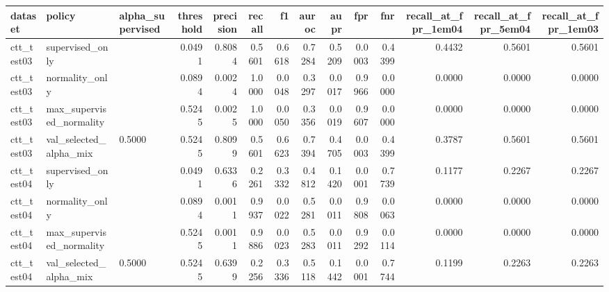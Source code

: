 \begin{tabular}{lllrrrrrrrrrrr}
\toprule
dataset & policy & alpha\_supervised & threshold & precision & recall & f1 & auroc & aupr & fpr & fnr & recall\_at\_fpr\_1em04 & recall\_at\_fpr\_5em04 & recall\_at\_fpr\_1em03 \\
\midrule
ctt\_test03 & supervised\_only &  & 0.0491 & 0.8084 & 0.5601 & 0.6618 & 0.7284 & 0.5209 & 0.0003 & 0.4399 & 0.4432 & 0.5601 & 0.5601 \\
ctt\_test03 & normality\_only &  & 0.0894 & 0.0024 & 1.0000 & 0.0048 & 0.3297 & 0.0017 & 0.9966 & 0.0000 & 0.0000 & 0.0000 & 0.0000 \\
ctt\_test03 & max\_supervised\_normality &  & 0.5245 & 0.0025 & 1.0000 & 0.0050 & 0.3356 & 0.0019 & 0.9607 & 0.0000 & 0.0000 & 0.0000 & 0.0000 \\
ctt\_test03 & val\_selected\_alpha\_mix & 0.5000 & 0.5245 & 0.8099 & 0.5601 & 0.6623 & 0.7394 & 0.4705 & 0.0003 & 0.4399 & 0.3787 & 0.5601 & 0.5601 \\
ctt\_test04 & supervised\_only &  & 0.0491 & 0.6336 & 0.2261 & 0.3332 & 0.4812 & 0.1420 & 0.0001 & 0.7739 & 0.1177 & 0.2267 & 0.2267 \\
ctt\_test04 & normality\_only &  & 0.0894 & 0.0011 & 0.9937 & 0.0022 & 0.5281 & 0.0011 & 0.9808 & 0.0063 & 0.0000 & 0.0000 & 0.0000 \\
ctt\_test04 & max\_supervised\_normality &  & 0.5245 & 0.0011 & 0.9886 & 0.0023 & 0.5283 & 0.0011 & 0.9292 & 0.0114 & 0.0000 & 0.0000 & 0.0000 \\
ctt\_test04 & val\_selected\_alpha\_mix & 0.5000 & 0.5245 & 0.6399 & 0.2256 & 0.3336 & 0.5118 & 0.1442 & 0.0001 & 0.7744 & 0.1199 & 0.2263 & 0.2263 \\
\bottomrule
\end{tabular}
